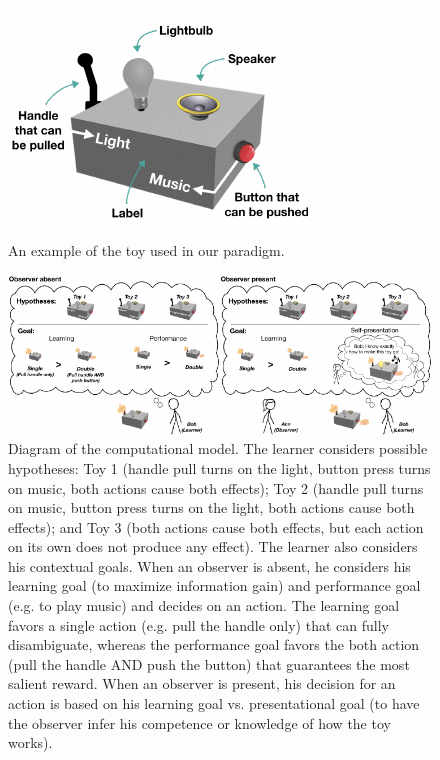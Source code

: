 \documentclass[10pt, letterpaper]{article}
\newenvironment{CodeChunk}{}{}
\begin{document}
\begin{CodeChunk}
\begin{figure}[t]

{\centering \includegraphics[width=0.8\linewidth]{figs/toy-1} 

}

\caption[An example of the toy used in our paradigm]{An example of the toy used in our paradigm.}\label{fig:toy}
\end{figure}
\end{CodeChunk}

\begin{CodeChunk}
\begin{figure}[tb]

{\centering \includegraphics[width=0.95\linewidth]{figs/model_diagram-1} 

}

\caption[Diagram of the computational model]{Diagram of the computational model. The learner considers possible hypotheses: Toy 1 (handle pull turns on the light, button press turns on music, both actions cause both effects); Toy 2 (handle pull turns on music, button press turns on the light, both actions cause both effects); and Toy 3 (both actions cause both effects, but each action on its own does not produce any effect). The learner also considers his contextual goals. When an observer is absent, he considers his learning goal (to maximize information gain) and performance goal (e.g. to play music) and decides on an action. The learning goal favors a single action (e.g. pull the handle only) that can fully disambiguate, whereas the performance goal favors the both action (pull the handle AND push the button) that guarantees the most salient reward. When an observer is present, his decision for an action is based on his learning goal vs. presentational goal (to have the observer infer his competence or knowledge of how the toy works).}\label{fig:model_diagram}
\end{figure}
\end{CodeChunk}
\end{document}
